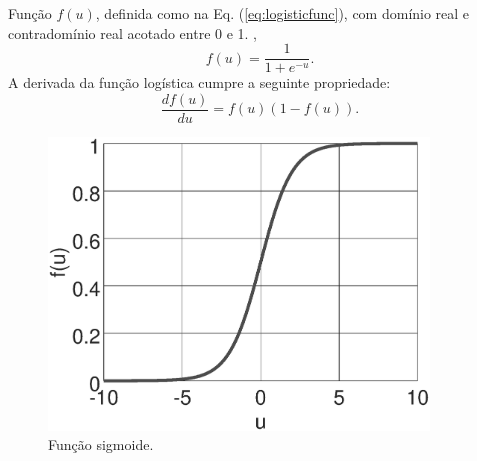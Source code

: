 

\begin{minipage}{0.55\textwidth}
\begin{definition}\label{def:logisticfunc}
Função $f(u)$, definida como na Eq. (\ref{eq:logisticfunc}), 
com domínio real e 
contradomínio real acotado entre 0 e 1. \cite[pp. 27]{kurkova2001artificial},
\begin{equation}\label{eq:logisticfunc}
f(u)=\frac{1}{1+e^{-u}}.
\end{equation}
A derivada da função logística cumpre a seguinte propriedade: 
\begin{equation}\label{eq:derlogisticfunc}
\frac{df(u)}{du}=f(u)(1-f(u)).
\end{equation}
\end{definition}
\end{minipage}
\begin{minipage}{0.45\textwidth}
     \begin{figure}[H]
         \centering
         \includegraphics[width=0.9\textwidth]{chapters/classificacao/mfiles/logisticfunc/sigmoid.eps}
         \caption{Função sigmoide. }
         \label{fig:logisticfunc}
     \end{figure}
\end{minipage}
